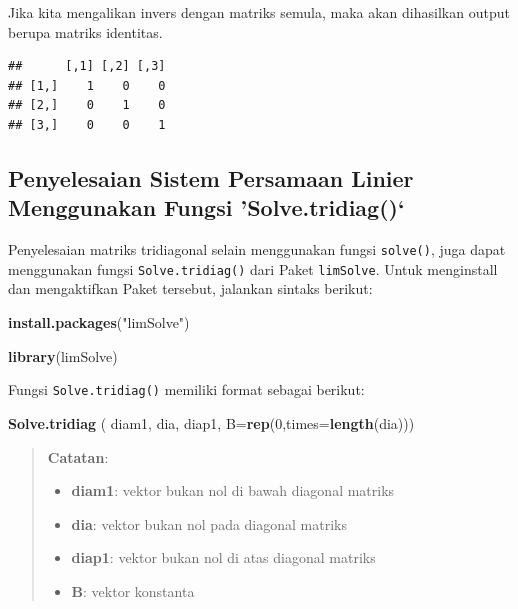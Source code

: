 \documentclass[]{book}
\newenvironment{Shaded}{\begin{snugshade}}{\end{snugshade}}
\newcommand{\DataTypeTok}[1]{\textcolor[rgb]{0.13,0.29,0.53}{#1}}
\newcommand{\DecValTok}[1]{\textcolor[rgb]{0.00,0.00,0.81}{#1}}
\newcommand{\KeywordTok}[1]{\textcolor[rgb]{0.13,0.29,0.53}{\textbf{#1}}}
\newcommand{\NormalTok}[1]{#1}
\newcommand{\OperatorTok}[1]{\textcolor[rgb]{0.81,0.36,0.00}{\textbf{#1}}}
\newcommand{\StringTok}[1]{\textcolor[rgb]{0.31,0.60,0.02}{#1}}
\providecommand{\tightlist}{%
  \setlength{\itemsep}{0pt}\setlength{\parskip}{0pt}}
\theoremstyle{definition}
\theoremstyle{definition}
\theoremstyle{definition}
\theoremstyle{remark}
\begin{document}
Jika kita mengalikan invers dengan matriks semula, maka akan dihasilkan output berupa matriks identitas.

\begin{Shaded}
\end{Shaded}

\begin{verbatim}
##      [,1] [,2] [,3]
## [1,]    1    0    0
## [2,]    0    1    0
## [3,]    0    0    1
\end{verbatim}

\hypertarget{solvetridiagfunct}{%
\subsection{Penyelesaian Sistem Persamaan Linier Menggunakan Fungsi 'Solve.tridiag()`}\label{solvetridiagfunct}}

Penyelesaian matriks tridiagonal selain menggunakan fungsi \texttt{solve()}, juga dapat menggunakan fungsi \texttt{Solve.tridiag()} dari Paket \texttt{limSolve}. Untuk menginstall dan mengaktifkan Paket tersebut, jalankan sintaks berikut:

\begin{Shaded}
\begin{Highlighting}[]
\KeywordTok{install.packages}\NormalTok{(}\StringTok{"limSolve"}\NormalTok{)}
\end{Highlighting}
\end{Shaded}

\begin{Shaded}
\begin{Highlighting}[]
\KeywordTok{library}\NormalTok{(limSolve)}
\end{Highlighting}
\end{Shaded}

Fungsi \texttt{Solve.tridiag()} memiliki format sebagai berikut:

\begin{Shaded}
\begin{Highlighting}[]
\KeywordTok{Solve.tridiag}\NormalTok{ ( diam1, dia, diap1, }\DataTypeTok{B=}\KeywordTok{rep}\NormalTok{(}\DecValTok{0}\NormalTok{,}\DataTypeTok{times=}\KeywordTok{length}\NormalTok{(dia)))}
\end{Highlighting}
\end{Shaded}

\begin{quote}
\textbf{Catatan}:

\begin{itemize}
\tightlist
\item
  \textbf{diam1}: vektor bukan nol di bawah diagonal matriks
\item
  \textbf{dia}: vektor bukan nol pada diagonal matriks
\item
  \textbf{diap1}: vektor bukan nol di atas diagonal matriks
\item
  \textbf{B}: vektor konstanta
\end{itemize}
\end{quote}
\end{document}
